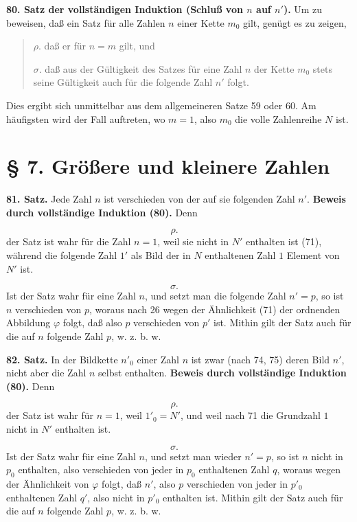 \documentclass[11pt]{article}
\begin{document}
\noindent\textbf{80. Satz der vollständigen Induktion (Schluß von $n$ auf $n'$).} Um zu beweisen, daß ein Satz für alle Zahlen $n$ einer Kette $m_0$ gilt, genügt es zu zeigen,
\begin{quote}
\(\rho.\) daß er für \(n=m\) gilt, und

\(\sigma.\) daß aus der Gültigkeit des Satzes für eine Zahl \(n\) der Kette \(m_0\) stets seine Gültigkeit auch für die folgende Zahl \(n'\) folgt.
\end{quote}
Dies ergibt sich unmittelbar aus dem allgemeineren Satze 59 oder 60. Am häufigsten wird der Fall auftreten, wo $m=1$, also $m_0$ die volle Zahlenreihe $N$ ist.

\section*{§ 7. Größere und kleinere Zahlen}

\noindent\textbf{81. Satz.} Jede Zahl $n$ ist verschieden von der auf sie folgenden Zahl $n'$. \textbf{Beweis durch vollständige Induktion (80).} Denn

\[
\rho.\quad
\]
der Satz ist wahr für die Zahl $n=1$, weil sie nicht in $N'$ enthalten ist (71), während die folgende Zahl $1'$ als Bild der in $N$ enthaltenen Zahl $1$ Element von $N'$ ist.

\[
\sigma.\quad
\]
Ist der Satz wahr für eine Zahl $n$, und setzt man die folgende Zahl $n'=p$, so ist $n$ verschieden von $p$, woraus nach 26 wegen der Ähnlichkeit (71) der ordnenden Abbildung $\varphi$ folgt, daß also $p$ verschieden von $p'$ ist. Mithin gilt der Satz auch für die auf $n$ folgende Zahl $p$, w. z. b. w.

\noindent\textbf{82. Satz.} In der Bildkette $n'_0$ einer Zahl $n$ ist zwar (nach 74, 75) deren Bild $n'$, nicht aber die Zahl $n$ selbst enthalten. \textbf{Beweis durch vollständige Induktion (80).} Denn

\[
\rho.\quad
\]
der Satz ist wahr für $n=1$, weil $1'_0=N'$, und weil nach 71 die Grundzahl $1$ nicht in $N'$ enthalten ist.

\[
\sigma.\quad
\]
Ist der Satz wahr für eine Zahl $n$, und setzt man wieder $n'=p$, so ist $n$ nicht in $p_0$ enthalten, also verschieden von jeder in $p_0$ enthaltenen Zahl $q$, woraus wegen der Ähnlichkeit von $\varphi$ folgt, daß $n'$, also $p$ verschieden von jeder in $p'_0$ enthaltenen Zahl $q'$, also nicht in $p'_0$ enthalten ist. Mithin gilt der Satz auch für die auf $n$ folgende Zahl $p$, w. z. b. w.
\end{document}
